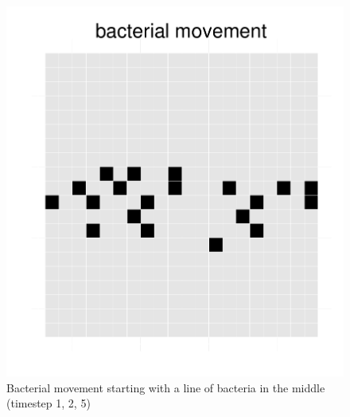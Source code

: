 \begin{figure}[h]
\begin{minipage}[t]{0.3\textwidth}
  \end{minipage}
  \begin{minipage}[t]{0.3\textwidth}
    \includegraphics[width=\textwidth]{mov3.pdf}
  \end{minipage}
  \caption{Bacterial movement starting with a line of bacteria in the middle (timestep 1, 2, 5)}
\end{figure}

